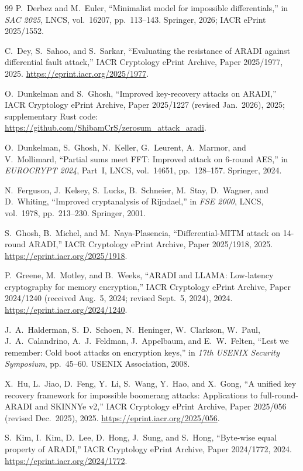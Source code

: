 \documentclass[11pt,a4paper]{article}
\theoremstyle{definition}
\theoremstyle{remark}
\begin{document}
\begin{thebibliography}{99}
P.~Derbez and M.~Euler,
``Minimalist model for impossible differentials,''
in \emph{SAC 2025}, LNCS, vol.~16207, pp.~113--143. Springer, 2026; IACR ePrint 2025/1552.

C.~Dey, S.~Sahoo, and S.~Sarkar,
``Evaluating the resistance of ARADI against differential fault attack,''
IACR Cryptology ePrint Archive, Paper 2025/1977, 2025. \url{https://eprint.iacr.org/2025/1977}.

O.~Dunkelman and S.~Ghosh,
``Improved key-recovery attacks on ARADI,''
IACR Cryptology ePrint Archive, Paper 2025/1227 (revised Jan.~2026), 2025; supplementary Rust code: \url{https://github.com/ShibamCrS/zerosum_attack_aradi}.

O.~Dunkelman, S.~Ghosh, N.~Keller, G.~Leurent, A.~Marmor, and V.~Mollimard,
``Partial sums meet FFT: Improved attack on 6-round AES,''
in \emph{EUROCRYPT 2024}, Part~I, LNCS, vol.~14651, pp.~128--157. Springer, 2024.

N.~Ferguson, J.~Kelsey, S.~Lucks, B.~Schneier, M.~Stay, D.~Wagner, and D.~Whiting,
``Improved cryptanalysis of Rijndael,''
in \emph{FSE 2000}, LNCS, vol.~1978, pp.~213--230. Springer, 2001.

S.~Ghosh, B.~Michel, and M.~Naya-Plasencia,
``Differential-MITM attack on 14-round ARADI,''
IACR Cryptology ePrint Archive, Paper 2025/1918, 2025. \url{https://eprint.iacr.org/2025/1918}.

P.~Greene, M.~Motley, and B.~Weeks,
``ARADI and LLAMA: Low-latency cryptography for memory encryption,''
IACR Cryptology ePrint Archive, Paper 2024/1240 (received Aug.~5, 2024; revised Sept.~5, 2024), 2024. \url{https://eprint.iacr.org/2024/1240}.

J.~A.~Halderman, S.~D.~Schoen, N.~Heninger, W.~Clarkson, W.~Paul, J.~A.~Calandrino, A.~J.~Feldman, J.~Appelbaum, and E.~W.~Felten,
``Lest we remember: Cold boot attacks on encryption keys,''
in \emph{17th USENIX Security Symposium}, pp.~45--60. USENIX Association, 2008.

X.~Hu, L.~Jiao, D.~Feng, Y.~Li, S.~Wang, Y.~Hao, and X.~Gong,
``A unified key recovery framework for impossible boomerang attacks: Applications to full-round-ARADI and SKINNYe v2,''
IACR Cryptology ePrint Archive, Paper 2025/056 (revised Dec.~2025), 2025. \url{https://eprint.iacr.org/2025/056}.

S.~Kim, I.~Kim, D.~Lee, D.~Hong, J.~Sung, and S.~Hong,
``Byte-wise equal property of ARADI,''
IACR Cryptology ePrint Archive, Paper 2024/1772, 2024. \url{https://eprint.iacr.org/2024/1772}.


\end{thebibliography}
\end{document}
